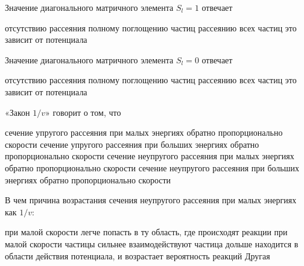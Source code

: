 \documentclass[11pt,a4paper]{exam}
\begin{document}
\begin{questions}
\question Значение диагонального матричного элемента ${S_l} = 1$ отвечает
\begin{choices}
\choice отсутствию рассеяния    
\choice полному поглощению частиц
\choice рассеянию всех частиц      
\choice это зависит от потенциала
\end{choices}

\question Значение диагонального матричного элемента ${S_l} = 0$ отвечает
\begin{choices}
\choice отсутствию рассеяния    
\choice полному поглощению частиц
\choice рассеянию всех частиц      
\choice это зависит от потенциала
\end{choices}

\question «Закон $1/v$» говорит о том, что
\begin{choices}
\choice сечение упругого рассеяния при малых энергиях обратно пропорционально скорости
\choice сечение упругого рассеяния при больших энергиях обратно пропорционально скорости
\choice сечение неупругого рассеяния при малых энергиях обратно пропорционально скорости
\choice сечение неупругого рассеяния при больших энергиях обратно пропорционально скорости
\end{choices}

\question В чем причина возрастания сечения неупругого рассеяния при малых энергиях как $1/v$:
\begin{choices}
\choice при малой скорости легче попасть в ту область, где происходят реакции
\choice при малой скорости частицы сильнее взаимодействуют
\choice частица дольше находится в области действия потенциала, и возрастает вероятность реакций
\choice Другая
\end{choices}

\end{questions}
\end{document}
